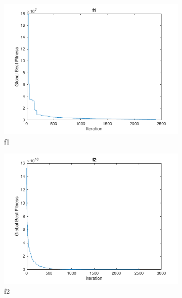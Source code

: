 \clearpage

\begin{figure}
  \centering
  \begin{subfigure}[b]{0.4\textwidth}
    \includegraphics[width=\textwidth]{img/cecrt/f1}
    \caption{f1}
  \end{subfigure}
  \begin{subfigure}[b]{0.4\textwidth}
    \includegraphics[width=\textwidth]{img/cecrt/f2}
    \caption{f2}
  \end{subfigure}
  \begin{subfigure}[b]{0.4\textwidth}

\end{subfigure}
\end{figure}
